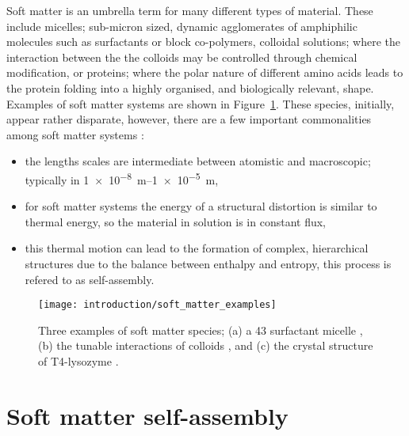 
Soft matter is an umbrella term for many different types of material.
These include micelles; sub-micron sized, dynamic agglomerates of amphiphilic molecules such as surfactants or block co-polymers, colloidal solutions; where the interaction between the the colloids may be controlled through chemical modification, or proteins; where the polar nature of different amino acids leads to the protein folding into a highly organised, and biologically relevant, shape.
Examples of soft matter systems are shown in Figure~\ref{fig:soft}.
These species, initially, appear rather disparate, however, there are a few important commonalities among soft matter systems \cite{jones_soft_2002}:
\begin{itemize}
\item the lengths scales are intermediate between atomistic and macroscopic; typically in \SIrange{1e-8}{1e-5}{\meter},
\item for soft matter systems the energy of a structural distortion is similar to thermal energy, so the material in solution is in constant flux,
\item this thermal motion can lead to the formation of complex, hierarchical structures due to the balance between enthalpy and entropy, this process is refered to as self-assembly.
\end{itemize}
%
\begin{figure}
    \centering
    \texttt{[image: introduction/soft\_matter\_examples]}
    \caption{Three examples of soft matter species; (a) a 43  surfactant micelle \cite{hargreaves_atomistic_2011}, (b) the tunable interactions of colloids \cite{kraft_patchy_2011}, and (c) the crystal structure of T4-lysozyme \cite{rose_crystal_1988}.}
    \label{fig:soft}
\end{figure}
%

\section{Soft matter self-assembly}


